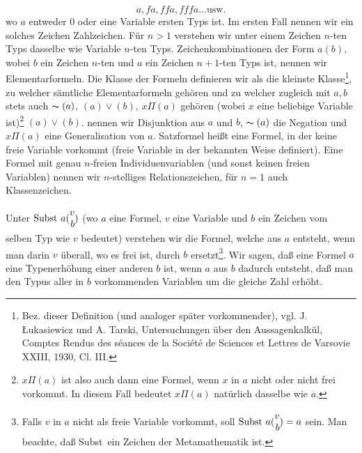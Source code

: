 \documentclass[draft]{scrartcl}
\newcounter{commentaryNumber}
\begin{document}
$$ a, fa, ffa, fffa \dots \text{usw.} $$
wo $a$ entweder 0 oder eine Variable ersten Typs ist.
Im ersten Fall nennen wir ein solches Zeichen Zahlzeichen.
Für $n > 1$ verstehen wir unter einem Zeichen $n$-ten
Typs dasselbe wie Variable $n$-ten Typs.
Zeichenkombinationen der Form $a\left(b\right)$, wobei
$b$ ein Zeichen $n$-ten und $a$ ein Zeichen $n + 1$-ten
Typs ist, nennen wir Elementarformeln. Die Klasse der
Formeln definieren wir als die kleinste
Klasse\footnote{Bez. dieser Definition (und analoger
später vorkommender), vgl. J. \L{}ukasiewicz und
A. Tarski, Untersuchungen über den Aussagenkalkül,
Comptes Rendus des s\'eances de la Soci\'et\'e de
Sciences et Lettres de Varsovie XXIII, 1930, Cl. III.},
zu welcher sämtliche Elementarformeln gehören und zu
welcher zugleich mit $a, b$ stets auch
$\thicksim\left(a\right)$, $\left(a\right)\lor\left(b\right)$, $x\Pi\left(a\right)$ gehören (wobei $x$ eine
\let\originalfootnote=\thefootnote
\let\thefootnote=\fnachtzehna
beliebige Variable ist)\footnote{$x\Pi\left(a\right)$ ist also auch dann eine
Formel, wenn $x$ in $a$ nicht oder nicht frei vorkommt. In diesem
Fall bedeutet $x\Pi\left(a\right)$ natürlich dasselbe wie $a$.}
\let\thefootnote=\originalfootnote
\setcounter{footnote}{19}
$\left(a\right)\lor\left(b\right)$. nennen wir Disjunktion aus $a$ und $b$,
$\thicksim\left(a\right)$ die Negation und $x\Pi\left(a\right)$ eine Generalisation von
$a$. Satzformel heißt eine Formel, in der keine freie Variable
vorkommt (freie Variable in der bekannten Weise
definiert). Eine Formel mit genau $n$-freien
Individuenvariablen (und sonst keinen freien Variablen)
nennen wir $n$-stelliges Relationszeichen, für $n = 1$
auch Klassenzeichen.

Unter $\text{Subst\ } a \Spvek{v; b}$ (wo $a$ eine Formel,
$v$ eine Variable und $b$ ein Zeichen vom selben Typ wie
$v$ bedeutet) verstehen wir die Formel, welche aus $a$
entsteht, wenn man darin $v$ überall, wo es frei ist, durch
$b$ ersetzt\footnote{Falls $v$ in $a$ nicht als freie
Variable vorkommt, soll $\text{Subst\ } a \Spvek{v; b} = a$
sein. Man beachte, daß \glqq Subst\grqq\ ein Zeichen der Metamathematik ist.}.
Wir sagen, daß eine Formel $a$ eine Typenerhöhung einer
anderen $b$ ist, wenn $a$ aus $b$ dadurch entsteht, daß
man den Typus aller in $b$ vorkommenden Variablen um die
gleiche Zahl erhöht.
\end{document}
